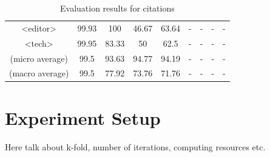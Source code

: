 \begin{table}[h]
\begin{center}
\begin{tabular}{|c|cccc|cccc|}
<editor>    &  99.93&   100     &46.67      &   63.64   & -     &   -   &   -       &   -   \\
<tech>  &   99.95   &   83.33   &   50      &   62.5    & -     &   -   &   -       &   -   \\
\hline
(micro average) & 99.5  &   93.63   &   94.77   &   94.19 & -    &   - &   -   &   -   \\
(macro average) & 99.5  &   77.92   &   73.76   &   71.76 & -    &   -  &   -   &   -   \\
\hline
\end{tabular}
\caption[Evaluation results for citations]{Evaluation results for citations}
\label{table:citationcomparison}
\end{center}
\end{table}

\section{Experiment Setup}
\label{sec:experimentsetup}
Here talk about k-fold, number of iterations, computing resources etc.


